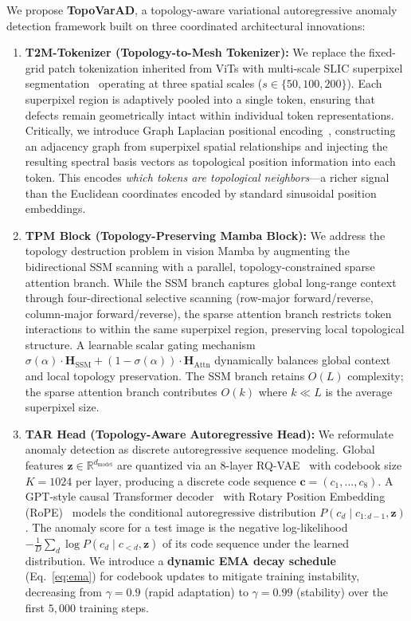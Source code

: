 \documentclass[lettersize,journal]{IEEEtran}
\begin{document}
We propose \textbf{TopoVarAD}, a topology-aware variational autoregressive anomaly detection framework built on three coordinated architectural innovations:

\begin{enumerate}
\item \textbf{T2M-Tokenizer (Topology-to-Mesh Tokenizer):} We replace the fixed-grid patch tokenization inherited from ViTs with multi-scale SLIC superpixel segmentation~\cite{achanta2012slic} operating at three spatial scales ($s \in \{50, 100, 200\}$). Each superpixel region is adaptively pooled into a single token, ensuring that defects remain geometrically intact within individual token representations. Critically, we introduce Graph Laplacian positional encoding~\cite{belkin2003laplacian,dwivedi2021graph}, constructing an adjacency graph from superpixel spatial relationships and injecting the resulting spectral basis vectors as topological position information into each token. This encodes \textit{which tokens are topological neighbors}---a richer signal than the Euclidean coordinates encoded by standard sinusoidal position embeddings.

\item \textbf{TPM Block (Topology-Preserving Mamba Block):} We address the topology destruction problem in vision Mamba by augmenting the bidirectional SSM scanning with a parallel, topology-constrained sparse attention branch. While the SSM branch captures global long-range context through four-directional selective scanning (row-major forward/reverse, column-major forward/reverse), the sparse attention branch restricts token interactions to within the same superpixel region, preserving local topological structure. A learnable scalar gating mechanism $\sigma(\alpha) \cdot \mathbf{H}_{\text{SSM}} + (1 - \sigma(\alpha)) \cdot \mathbf{H}_{\text{Attn}}$ dynamically balances global context and local topology preservation. The SSM branch retains $O(L)$ complexity; the sparse attention branch contributes $O(k)$ where $k \ll L$ is the average superpixel size.

\item \textbf{TAR Head (Topology-Aware Autoregressive Head):} We reformulate anomaly detection as discrete autoregressive sequence modeling. Global features $\mathbf{z} \in \mathbb{R}^{d_{\text{model}}}$ are quantized via an $8$-layer RQ-VAE~\cite{lee2022rqvae} with codebook size $K = 1024$ per layer, producing a discrete code sequence $\mathbf{c} = (c_1, \ldots, c_8)$. A GPT-style causal Transformer decoder~\cite{radford2018gpt} with Rotary Position Embedding (RoPE)~\cite{su2024rope} models the conditional autoregressive distribution $P(c_d \mid c_{1:d-1}, \mathbf{z})$. The anomaly score for a test image is the negative log-likelihood $-\frac{1}{D}\sum_d \log P(c_d \mid c_{<d}, \mathbf{z})$ of its code sequence under the learned distribution. We introduce a \textbf{dynamic EMA decay schedule} (Eq.~\ref{eq:ema}) for codebook updates to mitigate training instability, decreasing from $\gamma = 0.9$ (rapid adaptation) to $\gamma = 0.99$ (stability) over the first $5{,}000$ training steps.
\end{enumerate}
\end{document}
